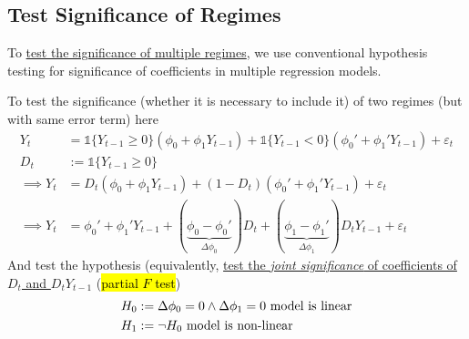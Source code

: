 \documentclass[11pt]{article}
\begin{document}
		\subsection{Test Significance of Regimes}
			\begin{remark}
				To \ul{test the significance of multiple regimes}, we use conventional hypothesis testing for significance of coefficients in multiple regression models.
			\end{remark}
			\begin{example}
				To test the significance (whether it is necessary to include it) of two regimes (but with same error term) here 
				\begin{align}
					Y_t &= \mathds{1}\{ Y_{t-1} \geq 0\} 
					\left ( 
						\phi_0 + \phi_1 Y_{t-1}
					\right )
					+ 
					\mathds{1}\{ Y_{t-1} < 0\} 
					\left ( 
						\phi_0' + \phi_1' Y_{t-1}
					\right ) + \varepsilon_t \\
					D_t &:= \mathds{1}\{ Y_{t-1} \geq 0\} \\
					\implies Y_t &= D_t \left (\phi_0 + \phi_1 Y_{t-1}\right ) + (1 - D_t) \left (\phi_0' + \phi_1' Y_{t-1}\right ) + \varepsilon_t \\
					\implies Y_t &= \phi_0' + \phi_1' Y_{t-1} + (\underbrace{\phi_0 - \phi_0'}_{\Delta \phi_0}) D_t + (\underbrace{\phi_1 - \phi_1'}_{\Delta \phi_1}) D_t Y_{t-1} + \varepsilon_t
				\end{align}
				And test the hypothesis (equivalently, \ul{test the \emph{joint significance} of coefficients of $D_t$ and $D_t Y_{t-1}$} (\hl{partial $F$ test})
				\begin{align}
					H_0 &:= \Delta \phi_0 = 0 \land \Delta \phi_1 = 0 \text{{ model is linear}}\\
					H_1 &:= \neg H_0 \text{{ model is non-linear}}
				\end{align}
			\end{example}
			
\end{document}
